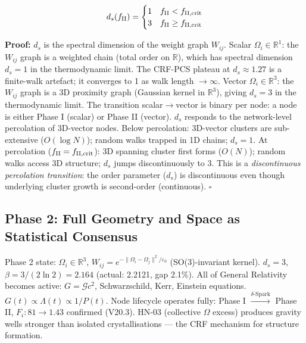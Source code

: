 \documentclass[12pt, a4paper]{article}
\begin{document}
\begin{derivedbox}[title={$d_s(f_{\rm II})$ Step Function (Proved from Graph Structure)}]
\[
  d_s(f_{\rm II}) = \begin{cases} 1 & f_{\rm II} < f_{\rm II,crit} \\ 3 & f_{\rm II} \geq f_{\rm II,crit} \end{cases}
\]

\textbf{Proof:} $d_s$ is the spectral dimension of the weight graph $W_{ij}$.
Scalar $\Omega_i\in\mathbb{R}^1$: the $W_{ij}$ graph is a weighted chain (total order on $\mathbb{R}$),
which has spectral dimension $d_s=1$ in the thermodynamic limit. The CRF-PCS plateau at
$d_s\approx 1.27$ is a finite-walk artefact; it converges to 1 as walk length $\to\infty$.
Vector $\Omega_i\in\mathbb{R}^3$: the $W_{ij}$ graph is a 3D proximity graph (Gaussian kernel
in $\mathbb{R}^3$), giving $d_s=3$ in the thermodynamic limit.
The transition scalar$\to$vector is binary per node: a node is either Phase I (scalar) or
Phase II (vector). $d_s$ responds to the network-level percolation of 3D-vector nodes.
Below percolation: 3D-vector clusters are sub-extensive ($O(\log N)$); random walks trapped
in 1D chains; $d_s=1$.
At percolation ($f_{\rm II}=f_{\rm II,crit}$): 3D spanning cluster first forms ($O(N)$);
random walks access 3D structure; $d_s$ jumps discontinuously to 3.
This is a \emph{discontinuous percolation transition}: the order parameter ($d_s$) is
discontinuous even though underlying cluster growth is second-order (continuous). $\square$
\end{derivedbox}

\subsection{Phase 2: Full Geometry and Space as Statistical Consensus}

\begin{formalbox}[title={Phase 2 --- Geometric Lock}]
Phase 2 state: $\Omega_i\in\mathbb{R}^3$, $W_{ij}=e^{-\|\Omega_i-\Omega_j\|^2/\varepsilon_0}$
(SO(3)-invariant kernel). $d_s=3$, $\beta=3/(2\ln 2)=2.164$ (actual: 2.2121, gap 2.1\%).
All of General Relativity becomes active: $G=\mathcal{G}c^2$, Schwarzschild, Kerr,
Einstein equations. $G(t)\propto\Lambda(t)\propto 1/P(t)$.
Node lifecycle operates fully: Phase I $\xrightarrow{\delta\text{-Spark}}$ Phase II,
$F_i:81\to 1.43$ confirmed (V20.3). HN-03 (collective $\Omega$ excess) produces gravity
wells stronger than isolated crystallisations --- the CRF mechanism for structure formation.
\end{formalbox}
\end{document}
